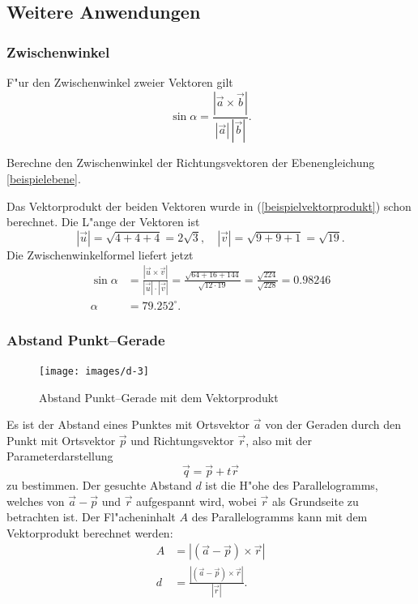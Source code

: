 \subsection{Weitere Anwendungen}

\subsubsection{Zwischenwinkel}
F"ur den Zwischenwinkel zweier Vektoren gilt
\[
\sin\alpha=\frac{|\vec a\times\vec b|}{|\vec a|\,|\vec b|}.
\]
\begin{beispiel}
Berechne den Zwischenwinkel der Richtungsvektoren der Ebenengleichung
\ref{beispielebene}.

\smallskip

{\parindent 0pt Das Vektorprodukt der beiden Vektoren wurde
in (\ref{beispielvektorprodukt}) schon
berechnet.} Die L"ange der Vektoren ist
\[
|\vec u|=\sqrt{4+4+4}=2\sqrt{3}
,
\quad
|\vec v|=\sqrt{9+9+1}=\sqrt{19}.
\]
Die Zwischenwinkelformel liefert jetzt
\begin{align*}
\sin\alpha&=\frac{|\vec u\times \vec v|}{|\vec u|\cdot |\vec v|}
=\frac{\sqrt{64+16+144}}{\sqrt{12\cdot 19}}
=\frac{\sqrt{224}}{\sqrt{228}}=0.98246\\
\alpha&=79.252^\circ.
\end{align*}
\end{beispiel}

\subsubsection{Abstand Punkt--Gerade}
\begin{figure}
\begin{center}
\texttt{[image: images/d-3]}
\end{center}
\caption{Abstand Punkt--Gerade mit dem Vektorprodukt\label{punkt-gerade}}
\end{figure}
Es ist der Abstand eines Punktes mit Ortsvektor $\vec a$ von der
Geraden durch den Punkt mit Ortsvektor $\vec p$ und Richtungsvektor $\vec r$,
also mit der Parameterdarstellung
\[
\vec q=\vec p+t\vec r
\]
zu bestimmen.
Der gesuchte Abstand $d$ ist die H"ohe des Parallelogramms,
welches von $\vec a-\vec p$
und $\vec r$ aufgespannt wird, wobei $\vec r$ als Grundseite zu betrachten ist.
Der Fl"acheninhalt $A$ des Parallelogramms kann mit dem Vektorprodukt
berechnet werden:
\begin{align*}
A&=|(\vec a-\vec p)\times\vec r|\\
d&=\frac{|(\vec a-\vec p)\times\vec r|}{|\vec r|}.
\end{align*}
